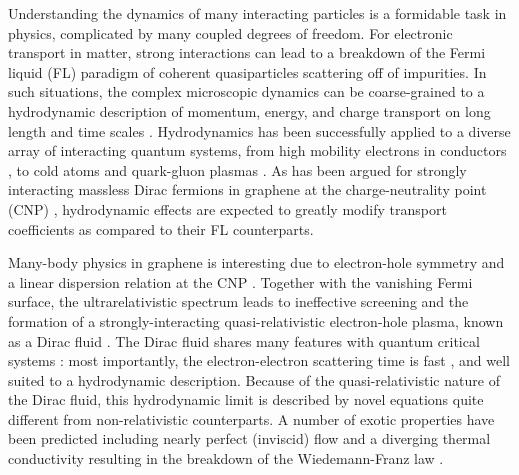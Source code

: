 \documentclass[10pt, oneside]{book}
\begin{document}
\begin{doublespace}
Understanding the dynamics of many interacting particles is a formidable task in physics, complicated by many coupled degrees of freedom.   For electronic transport in matter, strong interactions can lead to a breakdown of the Fermi liquid (FL) paradigm of coherent quasiparticles scattering off of impurities.  In such situations, the complex microscopic dynamics can be coarse-grained to a hydrodynamic description of momentum, energy, and charge transport on long length and time scales \cite{Kadanoff1963419}. Hydrodynamics has been successfully applied to a diverse array of interacting quantum systems, from high mobility electrons in conductors \cite{molenkamp}, to cold atoms \cite{cao} and quark-gluon plasmas \cite{shuryak}.   As has been argued for strongly interacting massless Dirac fermions in graphene at the charge-neutrality point (CNP) \cite{muller2, foster, apostolov, schutt}, hydrodynamic effects are expected to greatly modify transport coefficients as compared to their FL counterparts.

Many-body physics in graphene is interesting due to electron-hole symmetry and a linear dispersion relation at the CNP \cite{geim2005, kim2005}.  Together with the vanishing Fermi surface, the ultrarelativistic spectrum leads  to ineffective screening \cite{lanzara} and the formation of a strongly-interacting quasi-relativistic electron-hole plasma, known as a Dirac fluid \cite{schmalian}.  The Dirac fluid shares many features with quantum critical systems \cite{sk}: most importantly, the electron-electron scattering time is fast \cite{Lui:2010kh, breusing, koppensNP, johannsen}, and well suited to a hydrodynamic description.  Because of the quasi-relativistic nature of the Dirac fluid, this hydrodynamic limit is described by novel equations \cite{hkms} quite different from non-relativistic counterparts.   A number of exotic properties have been predicted including nearly perfect (inviscid) flow \cite{muller2009} and a diverging thermal conductivity resulting in the breakdown of the Wiedemann-Franz law \cite{muller2, foster}.  




\end{doublespace}
\end{document}
